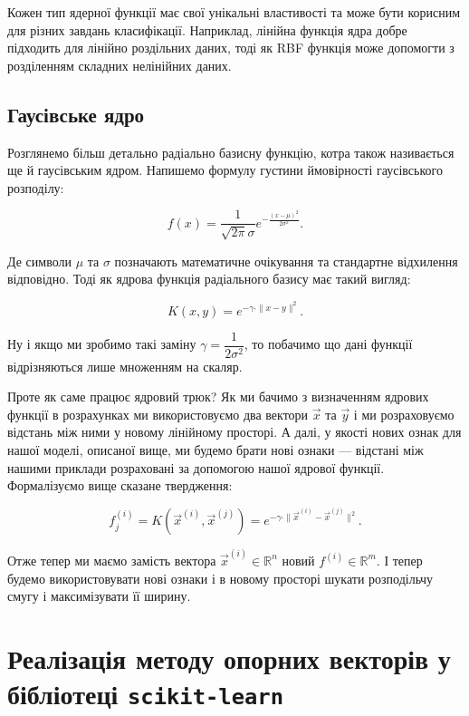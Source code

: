 \documentclass[]{article}
\begin{document}
Кожен тип ядерної функції має свої унікальні властивості та може бути корисним для різних завдань класифікації. Наприклад, лінійна функція ядра добре підходить для лінійно роздільних даних, тоді як RBF функція може допомогти з розділенням складних нелінійних даних.

\subsection{Гаусівське ядро}

Розглянемо більш детально радіально базисну функцію, котра також називається ще й гаусівським ядром. Напишемо формулу густини ймовірності гаусівського розподілу:

\begin{equation*}
	f(x) = \frac1{\sqrt{2\pi}\sigma}e^{-\frac{(x - \mu)^2}{2\sigma^2}}.
\end{equation*}

Де символи $\mu$ та $\sigma$ позначають математичне очікування та стандартне відхилення відповідно. Тоді як ядрова функція радіального базису має такий вигляд:

\begin{equation*}
	K(x, y) = e^{-\gamma \cdot \|x - y\|^2}.
\end{equation*}

Ну і якщо ми зробимо такі заміну $\gamma = \dfrac1{2\sigma^2}$, то побачимо що дані функції відрізняються лише множенням на скаляр.

Проте як саме працює ядровий трюк? Як ми бачимо з визначенням ядрових функції в розрахунках ми використовуємо два вектори $\vec{x}$ та $\vec{y}$ і ми розраховуємо відстань між ними у новому лінійному просторі. А далі, у якості нових ознак для нашої моделі, описаної вище, ми будемо брати нові ознаки --- відстані між нашими приклади розраховані за допомогою нашої ядрової функції. Формалізуємо вище сказане твердження:

\begin{equation*}
	f_j^{(i)} = K(\vec{x}^{(i)}, \vec{x}^{(j)}) = e^{-\gamma \cdot \|\vec{x}^{(i)} - \vec{x}^{(j)}\|^2}.
\end{equation*}

Отже тепер ми маємо замість вектора $\vec{x}^{(i)} \in \mathbb{R}^n$ новий $f^{(i)} \in \mathbb{R}^m$. І тепер будемо використовувати нові ознаки і в новому просторі шукати розподільчу смугу і максимізувати її ширину.

\section{Реалізація методу опорних векторів у бібліотеці \texttt{scikit-learn}}
\end{document}
